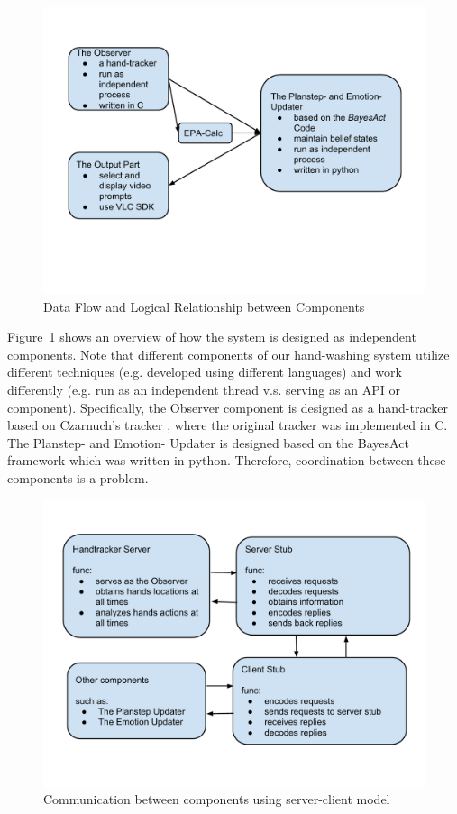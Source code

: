 \begin{figure}[htp]
\centering
\includegraphics[trim = 10mm 40mm 10mm 20mm, clip, width=0.9\linewidth]{fig/fig-dataflow.pdf}
\caption{Data Flow and Logical Relationship between Components}
\label{fig:dataflow}
\end{figure}


Figure~\ref{fig:dataflow} shows an overview of how the system is designed as independent components. Note that different components of our hand-washing system utilize different techniques (e.g. developed using different languages) and work differently (e.g. run as an independent thread v.s. serving as an API or component). Specifically, the Observer component is designed as a hand-tracker based on Czarnuch's tracker \cite{czarnuch2014}, where the original tracker was implemented in C. The Planstep- and Emotion- Updater is designed based on the BayesAct framework \cite{hoey2013bayesian} which was written in python. Therefore, coordination between these components is a problem. 


\begin{figure}[htp]
\centering
\includegraphics[trim = 6mm 22mm 6mm 18mm, clip, width=0.9\linewidth]{fig/fig-communication.pdf}
\caption{Communication between components using server-client model}
\label{fig:communication}
\end{figure}

